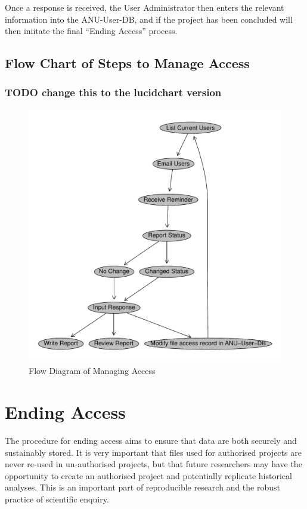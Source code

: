\documentclass[a4paper]{article}
\begin{document}
Once a response is received, the User Administrator then enters the relevant information into the ANU-User-DB, and if the project has been concluded will then iniitate the final ``Ending Access'' process.
\subsection{Flow Chart of Steps to Manage Access}
\label{sec-3-1}
\subsubsection{\textbf{TODO} change this to the lucidchart version}
\label{sec-3-1-1}

\begin{figure}[!h]
\centering
\includegraphics[width=\textwidth]{DataAccessFlowDiagram-ManagingAccess.pdf}
\caption{Flow Diagram of Managing Access}
\label{fig:DataAccessFlowDiagram-ManagingAccess}
\end{figure}
\clearpage
\section{Ending Access}
\label{sec-4}

The procedure for ending access aims to ensure that data are both securely and sustainably stored.  It is very important that files used for authorised projects are never re-used in un-authorised projects, but that future researchers may have the opportunity to create an authorised project and potentially replicate historical analyses.  This is an important part of reproducible research and the robust practice of scientific enquiry.
\end{document}
